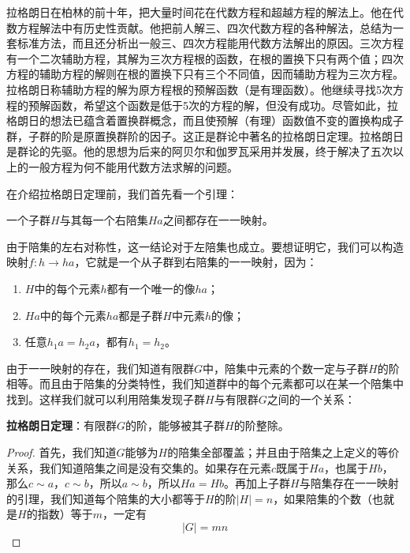 \documentclass[b5paper]{ctexart}
\begin{document}
拉格朗日在柏林的前十年，把大量时间花在代数方程和超越方程的解法上。他在代数方程解法中有历史性贡献。他把前人解三、四次代数方程的各种解法，总结为一套标准方法，而且还分析出一般三、四次方程能用代数方法解出的原因。三次方程有一个二次辅助方程，其解为三次方程根的函数，在根的置换下只有两个值；四次方程的辅助方程的解则在根的置换下只有三个不同值，因而辅助方程为三次方程。拉格朗日称辅助方程的解为原方程根的预解函数（是有理函数）。他继续寻找5次方程的预解函数，希望这个函数是低于5次的方程的解，但没有成功。尽管如此，拉格朗日的想法已蕴含着置换群概念，而且使预解（有理）函数值不变的置换构成子群，子群的阶是原置换群阶的因子。这正是群论中著名的拉格朗日定理。拉格朗日是群论的先驱。他的思想为后来的阿贝尔和伽罗瓦采用并发展，终于解决了五次以上的一般方程为何不能用代数方法求解的问题。

在介绍拉格朗日定理前，我们首先看一个引理：

\begin{lemma}
一个子群$H$与其每一个右陪集$Ha$之间都存在一一映射。
\end{lemma}

由于陪集的左右对称性，这一结论对于左陪集也成立。要想证明它，我们可以构造映射$f: h \to ha$，它就是一个从子群到右陪集的一一映射，因为：

\begin{enumerate}
\item $H$中的每个元素$h$都有一个唯一的像$ha$；
\item $Ha$中的每个元素$ha$都是子群$H$中元素$h$的像；
\item 任意$h_1a = h_2a$，都有$h_1 = h_2$。
\end{enumerate}

由于一一映射的存在，我们知道有限群$G$中，陪集中元素的个数一定与子群$H$的阶相等。而且由于陪集的分类特性，我们知道群中的每个元素都可以在某一个陪集中找到。这样我们就可以利用陪集发现子群$H$与有限群$G$之间的一个关系：

\begin{theorem}
\textbf{拉格朗日定理}：有限群$G$的阶，能够被其子群$H$的阶整除。
\end{theorem}

\begin{proof}
首先，我们知道$G$能够为$H$的陪集全部覆盖；并且由于陪集之上定义的等价关系，我们知道陪集之间是没有交集的。如果存在元素$c$既属于$Ha$，也属于$Hb$，那么$c \sim a$，$c \sim b$，所以$a \sim b$，所以$Ha = Hb$。再加上子群$H$与陪集存在一一映射的引理，我们知道每个陪集的大小都等于$H$的阶$|H|=n$，如果陪集的个数（也就是$H$的指数）等于$m$，一定有
\[
|G| = mn
\]
\end{proof}
\end{document}
